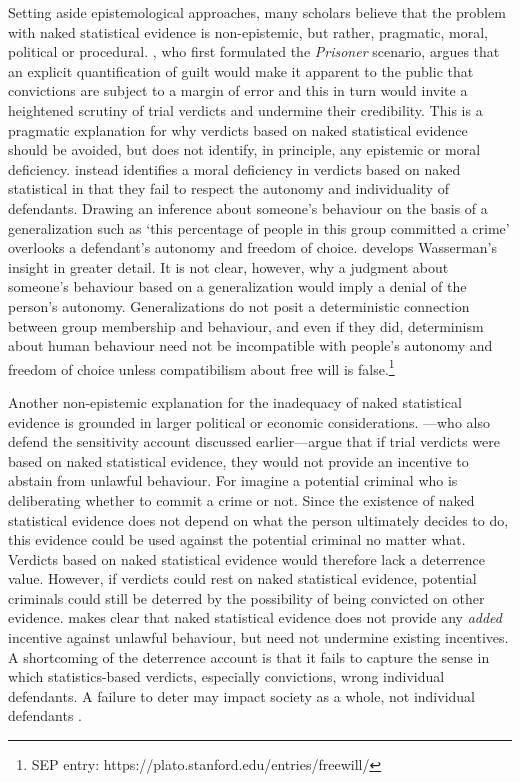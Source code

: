 \documentclass{article}
\begin{document}
Setting aside epistemological approaches, many scholars believe that the problem with naked statistical evidence is non-epistemic, but rather, pragmatic, moral, political or procedural. 
\citet{Nesson1979Reasonable-doub}, who first formulated the \textit{Prisoner} scenario,  argues that an explicit quantification of guilt would make it apparent to the  public that convictions are subject to a margin of error and this in turn would invite a heightened scrutiny of trial verdicts and undermine their credibility. This is a pragmatic explanation for why verdicts based on naked statistical evidence should be avoided, but does not identify, in principle, any epistemic or moral deficiency.
%
\cite{Wasserman91} instead identifies a moral deficiency in verdicts based on naked statistical in that they fail to respect the autonomy and individuality of defendants. Drawing an inference about someone's behaviour on the basis of a generalization such as `this percentage of  people in this group committed a crime' overlooks a defendant's autonomy and freedom of choice. \cite{Pundik2011The-Epistemoloi, pundik2017} develops Wasserman's insight in greater detail. It is not clear, however, why a judgment about someone's behaviour based on a generalization would imply a denial of the person's autonomy. Generalizations do not posit a deterministic connection between group membership and  behaviour, and even if they did, determinism about human behaviour need not be incompatible with people's autonomy and freedom of choice unless compatibilism about free will is false.\footnote{SEP entry: https://plato.stanford.edu/entries/freewill/}

Another non-epistemic
explanation for the inadequacy of naked statistical evidence is grounded in larger political or economic considerations.  \cite{Enoch2012Statistical}---who also defend the sensitivity account discussed earlier---argue that if trial verdicts were based on naked statistical evidence, they would not provide an incentive to abstain from unlawful behaviour. For imagine a potential criminal who is deliberating whether to commit a crime or not.  Since the existence of naked statistical evidence does not depend on what the person ultimately decides to do, this evidence could be used against the potential criminal no matter what. Verdicts based on naked statistical evidence would therefore lack a deterrence value. 
However, if verdicts could rest on naked statistical evidence, potential criminals could still be deterred by the possibility of being convicted on other evidence. %
\cite{dahlmanNakedStat2020} makes clear that naked statistical evidence does not provide any \textit{added} incentive against unlawful behaviour, but need not undermine existing incentives. 
A shortcoming of the deterrence account is that it fails to capture the sense in which statistics-based verdicts, especially convictions, wrong individual defendants. A failure to deter may impact society as a whole, not individual defendants \citep{gardiner2018, DiBelloONeil2020}. 
\end{document}
